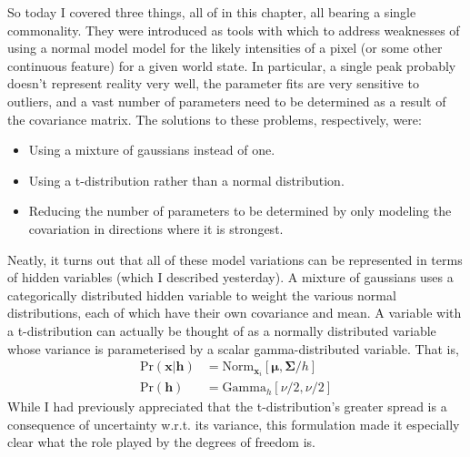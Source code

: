 \documentclass[idxtotoc,hyperref,openany]{labbook} %
\begin{document}
 So today I covered three things, all of in this chapter, all bearing a single commonality. They were introduced as tools with which to address weaknesses of using a normal model model for the likely intensities of a pixel (or some other continuous feature) for a given world state. In particular, a single peak probably doesn't represent reality very well, the parameter fits are very sensitive to outliers, and a vast number of parameters need to be determined as a result of the covariance matrix. The solutions to these problems, respectively, were:
 \begin{itemize}
 	\item Using a mixture of gaussians instead of one.
 	\item Using a t-distribution rather than a normal distribution.
 	\item Reducing the number of parameters to be determined by only modeling the covariation in directions where it is strongest.
 \end{itemize}
 Neatly, it turns out that all of these model variations can be represented in terms of hidden variables (which I described yesterday). A mixture of gaussians uses a categorically distributed hidden variable to weight the various normal distributions, each of which have their own covariance and mean. A variable with a t-distribution can actually be thought of as a normally distributed variable whose variance is parameterised by a scalar gamma-distributed variable. That is,
\begin{align*}
 	\text{Pr}(\mathbf{x}|\mathbf{h}) &= \text{Norm}_{\mathbf{x}_i}[\mathbf{\mu}, \mathbf{\Sigma}/h] \\
 	\text{Pr}(\mathbf{h}) &= \text{Gamma}_h[\nu/2, \nu/2]
\end{align*}
 While I had previously appreciated that the t-distribution's greater spread is a consequence of uncertainty w.r.t. its variance, this formulation made it especially clear what the role played by the degrees of freedom is.
 
\end{document}
